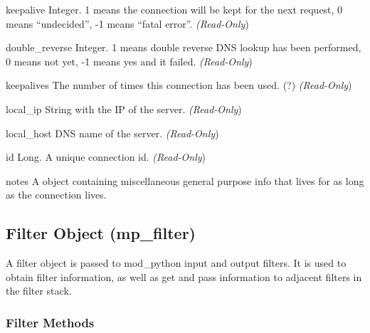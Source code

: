 \begin{memberdesc}[connection]{keepalive}
  Integer. 1 means the connection will be kept for the next request, 0 means
  ``undecided'', -1 means ``fatal error''.
  \emph{(Read-Only})
\end{memberdesc}

\begin{memberdesc}[connection]{double_reverse}
  Integer. 1 means double reverse DNS lookup has been performed, 0 means
  not yet, -1 means yes and it failed.
  \emph{(Read-Only})
\end{memberdesc}

\begin{memberdesc}[connection]{keepalives}
  The number of times this connection has been used. (?)
  \emph{(Read-Only})
\end{memberdesc}

\begin{memberdesc}[connection]{local_ip}
  String with the IP of the server.
  \emph{(Read-Only})
\end{memberdesc}

\begin{memberdesc}[connection]{local_host}
  DNS name of the server.
  \emph{(Read-Only})
\end{memberdesc}

\begin{memberdesc}[connection]{id}
  Long. A unique connection id.
  \emph{(Read-Only})
\end{memberdesc}

\begin{memberdesc}[connection]{notes}
  A  object containing miscellaneous general purpose info that lives for
  as long as the connection lives. 
\end{memberdesc}

\subsection{Filter Object (mp_filter)\label{pyapi-mpfilt}}

A filter object is passed to mod_python input and output filters. It
is used to obtain filter information, as well as get and pass
information to adjacent filters in the filter stack.

\subsubsection{Filter Methods\label{pyapi-mpfilt-meth}}

